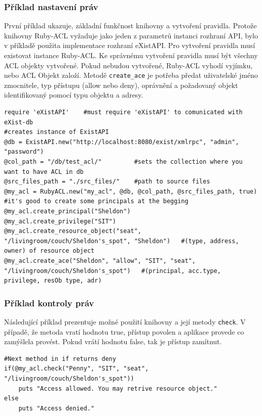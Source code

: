 
\subsubsection{Příklad nastavení práv}
První příklad ukazuje, základní funkčnost knihovny a vytvoření pravidla. 
Protože knihovny Ruby-ACL vyžaduje jako jeden z parametrů instanci rozhraní API, bylo v příkladě použita implementace rozhraní eXistAPI. Pro vytvoření pravidla musí existovat instance Ruby-ACL. Ke správnému vytvoření pravidla musí být všechny ACL objekty vytvořené. Pokud nebudou vytvořené, Ruby-ACL vyhodí vyjímku, nebo ACL Objekt založí. Metodě \verb|create_ace| je potřeba předat uživatelské jméno zmocnitele, typ přístupu (allow nebo deny), oprávnění a požadovaný objekt identifikovaný pomocí typu objektu a adresy.

\begin{lstlisting}
require 'eXistAPI'    #must require 'eXistAPI' to comunicated with eXist-db
#creates instance of ExistAPI
@db = ExistAPI.new("http://localhost:8080/exist/xmlrpc", "admin", "password")    
@col_path = "/db/test_acl/"         #sets the collection where you want to have ACL in db
@src_files_path = "./src_files/"    #path to source files
@my_acl = RubyACL.new("my_acl", @db, @col_path, @src_files_path, true)
#it's good to create some principals at the begging
@my_acl.create_principal("Sheldon")
@my_acl.create_privilege("SIT")
@my_acl.create_resource_object("seat", "/livingroom/couch/Sheldon's_spot", "Sheldon")	#(type, address, owner) of resource object
@my_acl.create_ace("Sheldon", "allow", "SIT", "seat", "/livingroom/couch/Sheldon's_spot")	#(principal, acc.type, privilege, resOb type, adr)
\end{lstlisting}


\subsubsection{Příklad kontroly práv}
Následující příklad prezentuje možné použití knihovny a její metody \verb|check|. V případě, že metoda vratí hodnotu true, přístup povolen a aplikace provede co zamýšlela provést. Pokud vrátí hodnotu false, tak je přístup zamítnut. 

\begin{lstlisting}[firstnumber=12]
#Next method in if returns deny
if(@my_acl.check("Penny", "SIT", "seat", "/livingroom/couch/Sheldon's_spot"))
	puts "Access allowed. You may retrive resource object."
else
	puts "Access denied."
\end{lstlisting}

